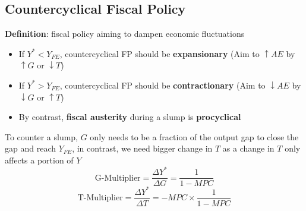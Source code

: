 \documentclass{article}
\begin{document}
\begin{multicols}{2}
\subsection{Countercyclical Fiscal Policy}
\textbf{Definition}: fiscal policy aiming to dampen economic fluctuations
\begin{itemize}
	\item If $Y^* < Y_{FE}$, countercyclical FP should be \textbf{expansionary} (Aim to $\uparrow AE$ by $\uparrow G$ or $\downarrow T$)
	\item If $Y^* > Y_{FE}$, countercyclical FP should be \textbf{contractionary} (Aim to $\downarrow AE$ by $\downarrow G$ or $\uparrow T$)
	\item By contrast, \textbf{fiscal austerity} during a slump is \textbf{procyclical}
\end{itemize}
To counter a slump, $G$ only needs to be a fraction of the output gap to close the gap and reach $Y_{FE}$, in contrast, we need bigger change in $T$ as a change in $T$ only affects a portion of $Y$
$$\text{G-Multiplier} = \frac{\Delta Y^*}{\Delta G} = \frac{1}{1-MPC}$$
$$\text{T-Multiplier} = \frac{\Delta Y^*}{\Delta T} = -MPC \times \frac{1}{1-MPC}$$

\end{multicols}
\end{document}
